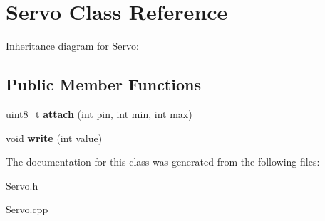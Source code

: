 \hypertarget{classServo}{}\section{Servo Class Reference}
\label{classServo}


Inheritance diagram for Servo\+:
\subsection*{Public Member Functions}
\begin{DoxyCompactItemize}
\item 
uint8\+\_\+t {\bfseries attach} (int pin, int min, int max)\hypertarget{classServo_a70076d9a77de97241badd1f377817219}{}\label{classServo_a70076d9a77de97241badd1f377817219}

\item 
void {\bfseries write} (int value)\hypertarget{classServo_a72b4b546912eada96a6ef705168ceb8a}{}\label{classServo_a72b4b546912eada96a6ef705168ceb8a}

\end{DoxyCompactItemize}


The documentation for this class was generated from the following files\+:\begin{DoxyCompactItemize}
\item 
Servo.\+h\item 
Servo.\+cpp\end{DoxyCompactItemize}
